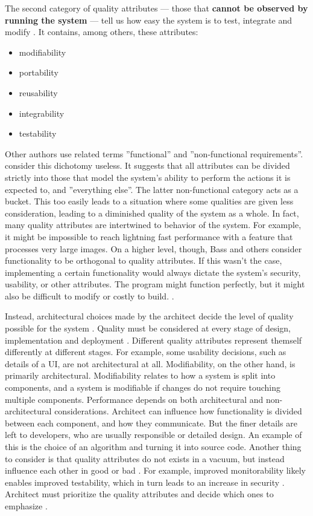 \documentclass[utf8,english]{gradu3}
\begin{document}
The second category of quality attributes --- those that \textbf{cannot be
  observed by running the system} --- tell us how easy the system is to test,
integrate and modify \parencite[81]{Bass1998}. It contains, among others, these
attributes:
\begin{itemize}
  \item modifiability
  \item portability
  \item reusability
  \item integrability
  \item testability
\end{itemize}

Other authors use related terms ''functional'' and ''non-functional
requirements''. \textcite[76]{Bass1998} consider this dichotomy useless. It
suggests that all attributes can be divided strictly into those that model the
system's ability to perform the actions it is expected to, and ''everything
else''. The latter non-functional category acts as a bucket. This too easily
leads to a situation where some qualities are given less consideration, leading
to a diminished quality of the system as a whole. In fact, many quality
attributes are intertwined to behavior of the system. For example, it might be
impossible to reach lightning fast performance with a feature that processes
very large images. On a higher level, though, Bass and others consider
functionality to be orthogonal to quality attributes. If this wasn't the case,
implementing a certain functionality would always dictate the system's security,
usability, or other attributes. The program might function perfectly, but it
might also be difficult to modify or costly to build. \parencite[77]{Bass1998}.

Instead, architectural choices made by the architect decide the level of quality
possible for the system \parencite[72]{Bass2003}. Quality must be considered at
every stage of design, implementation and deployment \parencite{Bass1998}.
Different quality attributes represent themself differently at different stages.
For example, some usability decisions, such as details of a UI, are not
architectural at all. Modifiability, on the other hand, is primarily
architectural. Modifiability relates to how a system is split into components,
and a system is modifiable if changes do not require touching multiple
components. Performance depends on both architectural and non-architectural
considerations. Architect can influence how functionality is divided between
each component, and how they communicate. But the finer details are left to
developers, who are usually responsible or detailed design. An example of this
is the choice of an algorithm and turning it into source code. Another thing to
consider is that quality attributes do not exists in a vacuum, but instead
influence each other in good or bad \parencite[78]{Bass1998}. For example,
improved monitorability likely enables improved testability, which in turn leads
to an increase in security \parencite[18]{Li2021}. Architect must prioritize the
quality attributes and decide which ones to emphasize \parencite[129]{Bass1998}.
\end{document}
